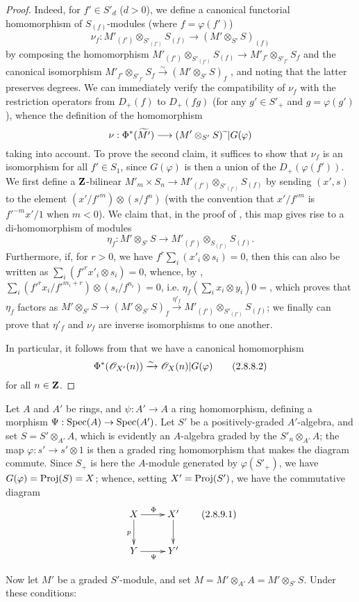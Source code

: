 \begin{proof}
Indeed, for $f'\in S'_d$ ($d>0$), we define a canonical functorial homomorphism of $S_{(f)}$-modules (where $f=\varphi(f')$)
\[
\label{II.2.8.8.1}
  \nu_f: M'_{(f')}\otimes_{S'_{(f')}}S_{(f)} \to (M'\otimes_{S'}S)_{(f)}
\tag{2.8.8.1}
\]
by composing the homomorphism $M'_{(f')}\otimes_{S'_{(f')}}S_{(f)}\to M'_{f'}\otimes_{S'_{f'}}S_f$ and the canonical isomorphism $M'_{f'}\otimes_{S'_{f'}}S_f\xrightarrow{\sim}(M'\otimes_{S'}S)_f$ , and noting that the latter preserves degrees.
We can immediately verify the compatibility of $\nu_f$ with the restriction operators from $D_+(f)$ to $D_+(fg)$ (for any $g'\in S'_+$ and $g=\varphi(g')$), whence the definition of the homomorphism
\[
  \nu: \Phi^*(\widetilde{M'}) \to (M'\otimes_{S'}S)\supertilde|G(\varphi)
\]
taking  into account.
To prove the second claim, it suffices to show that $\nu_f$ is an isomorphism for all $f'\in S_1$, since $G(\varphi)$ is then a union of the $D_+(\varphi(f'))$.
We first define a $\mathbf{Z}$-bilinear $M'_m\times S_n\to M'_{(f')}\otimes_{S'_{(f')}}S_{(f)}$ by sending $(x',s)$ to the element $(x'/{f'}^m)\otimes(s/f^n)$ (with the convention that $x'/{f'}^m$ is ${f'}^{-m}x'/1$ when $m<0$).
We claim that, in the proof of , this map gives rise to a di-homomorphism of modules
\[
  \eta_f: M'\otimes_{S'}S \to M'_{(f')}\otimes_{S_{(f')}}S_{(f)}.
\]
Furthermore, if, for $r>0$, we have $f^r\sum_i(x'_i\otimes s_i)=0$, then this can also be written as $\sum_i({f'}^rx'_i\otimes s_i)=0$, whence, by , $\sum_i({f'}^rx_i/{f'}^{m_i+r})\otimes(s_i/f^{n_i})=0$, i.e. $\eta_f(\sum_i x_i\otimes y_i)0=$, which proves that $\eta_f$ factors as $M'\otimes_{S'}S\to(M'\otimes_{S'}S)_f\xrightarrow{\eta'_f}M'_{(f')}\otimes_{S'_{(f')}}S_{(f)}$;
we finally can prove that $\eta'_f$ and $\nu_f$ are inverse isomorphisms to one another.

In particular, it follows from  that we have a canonical homomorphism
\[
\label{II.2.8.8.2}
  \Phi^*(\mathscr{O}_{X'}(n)) \xrightarrow{\sim} \mathscr{O}_X(n)|G(\varphi)
\tag{2.8.8.2}
\]
for all $n\in\mathbf{Z}$.
\end{proof}

\begin{env}[2.8.9]
\label{II.2.8.9}
Let $A$ and $A'$ be rings, and $\psi:A'\to A$ a ring homomorphism, defining a morphism $\Psi:\Spec(A)\to\Spec(A')$.
Let $S'$ be a positively-graded $A'$-algebra, and set $S=S'\otimes_{A'}A$, which is evidently an $A$-algebra graded by the $S'_n\otimes_{A'}A$;
the map $\varphi:s'\to s'\otimes1$ is then a graded ring homomorphism that makes the diagram  commute.
Since $S_+$ is here the $A$-module generated by $\varphi(S'_+)$, we have $G(\varphi)=\operatorname{Proj}(S)=X$;
whence, setting $X'=\operatorname{Proj}(S')$, we have the commutative diagram
\[
\label{II.2.8.9.1}
  \xymatrix{
    X \ar[r]^{\Phi} \ar[d]_p
    & X' \ar[d]
  \\Y \ar[r]_{\Psi}
    & Y'
  }
\tag{2.8.9.1}
\]

Now let $M'$ be a graded $S'$-module, and set $M=M'\otimes_{A'}A=M'\otimes_{S'}S$.
Under these conditions:
\end{env}

